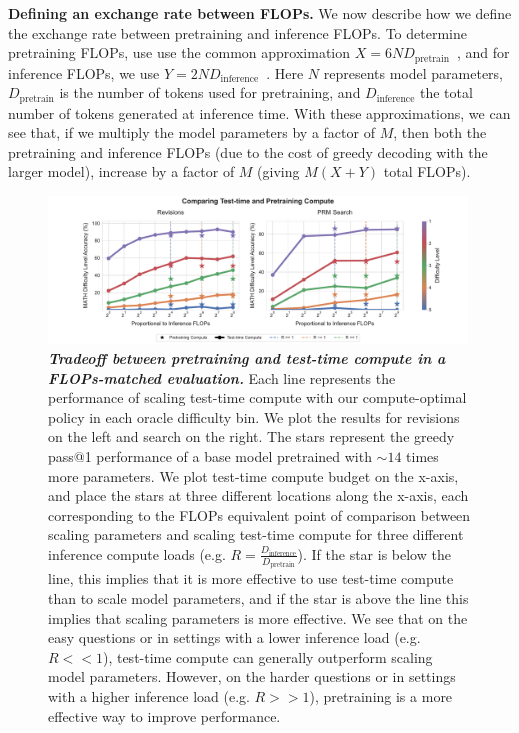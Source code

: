 \textbf{Defining an exchange rate between FLOPs.} We now describe how we define the exchange rate between pretraining and inference FLOPs. To determine pretraining FLOPs, use use the common approximation $X = 6ND_{\text{pretrain}}$~\citep{hoffmann2022training}, and for inference FLOPs, we use $Y = 2ND_{\text{inference}}$~\citep{sardana2023chinchillaoptimal}. Here $N$ represents model parameters, $D_{\text{pretrain}}$ is the number of tokens used for pretraining, and $D_{\text{inference}}$ the total number of tokens generated at inference time. With these approximations, we can see that, if we multiply the model parameters by a factor of $M$, then both the pretraining and inference FLOPs (due to the cost of greedy decoding with the larger model), increase by a factor of $M$ (giving $M(X+Y)$ total FLOPs).

\begin{figure}[t]
    \centering
    \vspace{-0.3cm}
    \includegraphics[trim=2.5cm 0cm 2.5cm 0cm, clip, width=0.99\textwidth]{figures/comparing_test_pretrain_v8.pdf}
    \vspace{-0.4cm}
    \caption{\footnotesize{\textbf{\emph{Tradeoff between pretraining and test-time compute in a FLOPs-matched evaluation.}} Each line represents the performance of scaling test-time compute with our compute-optimal policy in each oracle difficulty bin. We plot the results for revisions on the left and search on the right. The stars represent the greedy pass@1 performance of a base model pretrained with $\sim14$ times more parameters. We plot test-time compute budget on the x-axis, and place the stars at three different locations along the x-axis, each corresponding to the FLOPs equivalent point of comparison between scaling parameters and scaling test-time compute for three different inference compute loads (e.g. $R = \frac{D_{\text{inference}}}{D_{\text{pretrain}}}$). If the star is below the line, this implies that it is more effective to use test-time compute than to scale model parameters, and if the star is above the line this implies that scaling parameters is more effective. We see that on the easy questions or in settings with a lower inference load (e.g. $R << 1$), test-time compute can generally outperform scaling model parameters. However, on the harder questions or in settings with a higher inference load (e.g. $R >> 1$), pretraining is a more effective way to improve performance.}}
    \label{fig:pretrain_exchange}
    \vspace{-0.4cm}
\end{figure}


